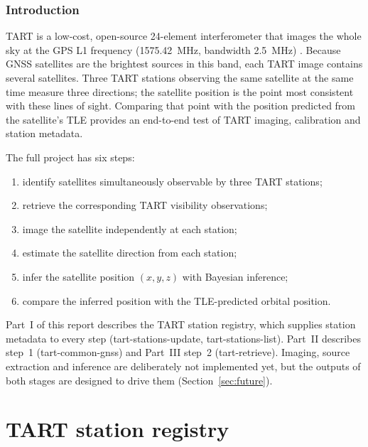 \documentclass[11pt,a4paper]{article}
\newcommand{\code}[1]{{\ttfamily\def\_{\textunderscore\allowbreak}#1}}
\begin{document}
\tableofcontents

\section{Introduction}

TART is a low-cost, open-source 24-element interferometer that images the
whole sky at the GPS L1 frequency (\SI{1575.42}{\mega\hertz}, bandwidth
\SI{2.5}{\mega\hertz}) \cite{tart}. Because GNSS satellites are the brightest
sources in this band, each TART image contains several satellites. Three
TART stations observing the same satellite at the same time measure three
directions; the satellite position is the point most consistent with these
lines of sight. Comparing that point with the position predicted from the
satellite's TLE provides an end-to-end test of TART imaging, calibration and
station metadata.

The full project has six steps:
\begin{enumerate}
\item identify satellites simultaneously observable by three TART stations;
\item retrieve the corresponding TART visibility observations;
\item image the satellite independently at each station;
\item estimate the satellite direction from each station;
\item infer the satellite position $(x,y,z)$ with Bayesian inference;
\item compare the inferred position with the TLE-predicted orbital position.
\end{enumerate}
Part~I of this report describes the TART station registry, which supplies
station metadata to every step (\code{tart-stations-update},
\code{tart-stations-list}). Part~II describes step~1 (\code{tart-common-gnss})
and Part~III step~2 (\code{tart-retrieve}). Imaging, source extraction and inference are
deliberately not implemented yet, but the outputs of both stages are
designed to drive them (Section~\ref{sec:future}).

\part{TART station registry}
\label{sec:registry-part}
\end{document}
